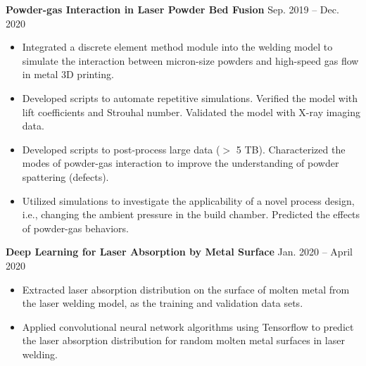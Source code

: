 \documentclass[11pt, letterpaper]{article}
\begin{document}
\vspace{3pt}
\textbf{Powder-gas Interaction in Laser Powder Bed Fusion} \hfill Sep. 2019 -- Dec. 2020
\begin{itemize}[leftmargin=*, labelsep=5mm]
   \item Integrated a discrete element method module into the welding model to simulate the
      interaction between micron-size  powders and high-speed gas flow in metal 3D printing.
   \item Developed scripts to automate repetitive simulations. Verified the model with lift
      coefficients and Strouhal number. Validated the model with X-ray imaging data.
   \item Developed scripts to post-process large data ($>$ 5 TB). Characterized the modes of
      powder-gas interaction to improve the understanding of powder spattering (defects).
   \item Utilized simulations to investigate the applicability of a novel process design, i.e.,
      changing the ambient pressure in the build chamber. Predicted the effects of powder-gas
      behaviors.
\end{itemize}

\vspace{3pt}


\textbf{Deep Learning for Laser Absorption by Metal Surface} \hfill Jan. 2020 -- April 2020
\begin{itemize}[leftmargin=*, labelsep=5mm]
   \item Extracted laser absorption distribution on the surface of molten metal from the laser
      welding model, as the training and validation data sets.
   \item Applied convolutional neural network algorithms using Tensorflow to predict the laser
      absorption distribution for random molten metal surfaces in laser welding.
\end{itemize}
\end{document}
